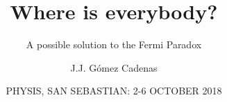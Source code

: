 \documentclass[9pt]{beamer}
\title{Where is everybody?}
\subtitle{A possible solution to the Fermi Paradox}
\author{J.J. G\'omez Cadenas}
\institute{Donostia International Physics Center (DIPC)} %
\date[October 6th, 2018] %
{PHYSIS, SAN SEBASTIAN: 2-6 OCTOBER 2018}
\begin{document}
\frame{\titlepage}

%

\end{document}
